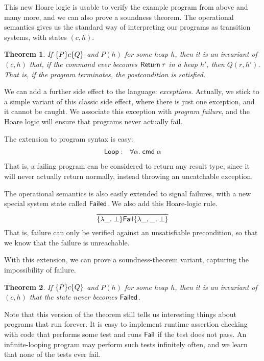 \documentclass{amsbook}
\newtheorem{theorem}{Theorem}[chapter]
\theoremstyle{definition}
\theoremstyle{remark}
\numberwithin{section}{chapter}
\numberwithin{equation}{chapter}
\begin{document}
This new Hoare logic is usable to verify the example program from above and many more, and we can also prove a soundness theorem.
The operational semantics gives us the standard way of interpreting our programs as transition systems, with states $(c, h)$.

\invariants
\begin{theorem}
  If $\{P\} c \{Q\}$ and $P(h)$ for some heap $h$, then it is an invariant of $(c, h)$ that, if the command ever becomes $\mathsf{Return} \; r$ in a heap $h'$, then $Q(r, h')$.  That is, if the program terminates, the postcondition is satisfied.
\end{theorem}

We can add a further side effect to the language: \emph{exceptions}.
Actually, we stick to a simple variant of this classic side effect, where there is just one exception, and it cannot be caught.
We associate this exception with \emph{program failure}, and the Hoare logic will ensure that programs never actually fail.

The extension to program syntax is easy:
\begin{eqnarray*}
  \mathsf{Loop} &:& \forall \alpha. \; \mathsf{cmd} \; \alpha
\end{eqnarray*}
That is, a failing program can be considered to return any result type, since it will never actually return normally, instead throwing an uncatchable exception.

The operational semantics is also easily extended to signal failures, with a new special system state called $\mathsf{Failed}$.
We also add this Hoare-logic rule.
$$\infer{\hoare{\lambda \_. \; \bot}{\mt{Fail}}{\lambda \_, \_. \; \bot}}{}$$
That is, failure can only be verified against an unsatisfiable precondition, so that we know that the failure is unreachable.

With this extension, we can prove a soundness-theorem variant, capturing the impossibility of failure.

\invariants
\begin{theorem}
  If $\{P\} c \{Q\}$ and $P(h)$ for some heap $h$, then it is an invariant of $(c, h)$ that the state never becomes $\mathsf{Failed}$.
\end{theorem}

Note that this version of the theorem still tells us interesting things about programs that run forever.
It is easy to implement runtime assertion checking with code that performs some test and runs $\mathsf{Fail}$ if the test does not pass.
An infinite-looping program may perform such tests infinitely often, and we learn that none of the tests ever fail.
\end{document}
